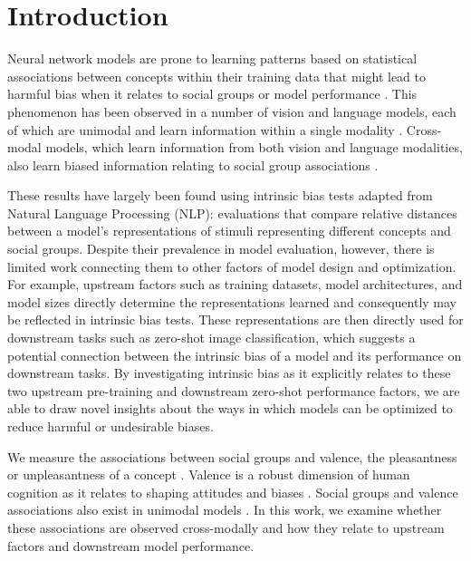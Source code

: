\section{Introduction}
Neural network models are prone to learning patterns based on statistical associations between concepts within their training data that might lead to harmful bias when it relates to social groups or model performance \citep{fabbrizzi2022survey}. This phenomenon has been observed in a number of vision and language models, each of which are unimodal and learn information within a single modality \citep{Caliskan2017SemanticsBiases, Guo2021DetectingBiases, Steed2021, Wolfe2022VAST:Models, omrani2023evaluating}. Cross-modal models, which learn information from both vision and language modalities, also learn biased information relating to social group associations \cite{Goh2021MultimodalNetworks,Wolfe2022AmericanAI,  Wolfe2022EvidenceAI,
Wolfe2022MarkednessAI, Wolfe2023ContrastiveBias, Janghorbani2023Multi-ModalModels, Berg2022ALearning, mandal_multimodal_2023, hall_visogender_2023}.

These results have largely been found using intrinsic bias tests adapted from Natural Language Processing (NLP): evaluations that compare relative distances between a model's representations of stimuli representing different concepts and social groups. Despite their prevalence in model evaluation, however, there is limited work connecting them to other factors of model design and optimization. For example,  upstream factors such as training datasets, model architectures, and model sizes directly determine the representations learned and consequently may be reflected in intrinsic bias tests. These representations are then directly used for downstream tasks such as zero-shot image classification, which suggests a potential connection between the intrinsic bias of a model and its performance on downstream tasks. By investigating intrinsic bias as it explicitly relates to these two upstream pre-training and downstream zero-shot performance factors, we are able to draw novel insights about the ways in which models can be optimized to reduce harmful or undesirable biases.

We measure the associations between social groups and valence, the pleasantness or unpleasantness of a concept \citep{toney2020valnorm}. Valence is a robust dimension of human cognition as it relates to shaping attitudes and biases \citep{harmon2013does}. Social groups and valence associations also exist in unimodal models \citep{ Wolfe2022VAST:Models}. In this work, we examine whether these associations are observed cross-modally and how they relate to upstream factors and downstream model performance. 

